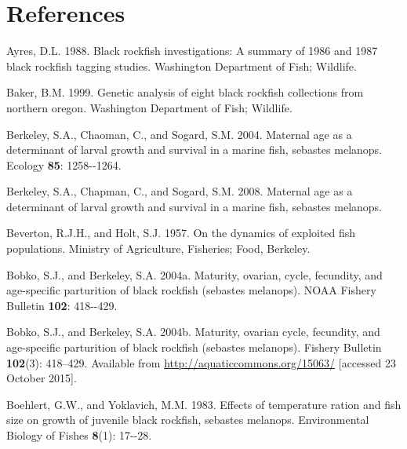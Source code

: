 \documentclass[11pt,
  english,
  letterpaper,
]{article}
\newlength{\cslhangindent}
\newenvironment{CSLReferences}[2] %
 {%
  \setlength{\parindent}{0pt}
  \ifodd #1 \everypar{\setlength{\hangindent}{\cslhangindent}}\ignorespaces\fi
  \ifnum #2 > 0
  \setlength{\parskip}{#2\baselineskip}
  \fi
 }%
 {}
\begin{document}
\clearpage

\hypertarget{references}{%
\section{References}\label{references}}

\hypertarget{refs}{}
\begin{CSLReferences}{1}{0}
\leavevmode{}%
Ayres, D.L. 1988. Black rockfish investigations: A summary of 1986 and 1987 black rockfish tagging studies. Washington Department of Fish; Wildlife.

\leavevmode{}%
Baker, B.M. 1999. Genetic analysis of eight black rockfish collections from northern oregon. Washington Department of Fish; Wildlife.

\leavevmode{}%
Berkeley, S.A., Chaoman, C., and Sogard, S.M. 2004. Maternal age as a determinant of larval growth and survival in a marine fish, sebastes melanops. Ecology \textbf{85}: 1258-\/-1264.

\leavevmode{}%
Berkeley, S.A., Chapman, C., and Sogard, S.M. 2008. Maternal age as a determinant of larval growth and survival in a marine fish, sebastes melanops.

\leavevmode{}%
Beverton, R.J.H., and Holt, S.J. 1957. On the dynamics of exploited fish populations. Ministry of Agriculture, Fisheries; Food, Berkeley.

\leavevmode{}%
Bobko, S.J., and Berkeley, S.A. 2004a. Maturity, ovarian, cycle, fecundity, and age-specific parturition of black rockfish (sebastes melanops). NOAA Fishery Bulletin \textbf{102}: 418-\/-429.

\leavevmode{}%
Bobko, S.J., and Berkeley, S.A. 2004b. Maturity, ovarian cycle, fecundity, and age-specific parturition of black rockfish (sebastes melanops). Fishery Bulletin \textbf{102}(3): 418--429. Available from \url{http://aquaticcommons.org/15063/} {[}accessed 23 October 2015{]}.

\leavevmode{}%
Boehlert, G.W., and Yoklavich, M.M. 1983. Effects of temperature ration and fish size on growth of juvenile black rockfish, sebastes melanops. Environmental Biology of Fishes \textbf{8}(1): 17-\/-28.


\end{CSLReferences}
\end{document}
